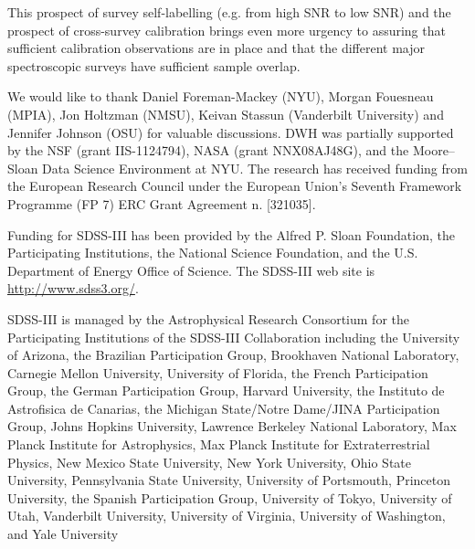 \documentclass[12pt, preprint]{aastex}
\begin{document}
This prospect of survey self-labelling (e.g. from high SNR to low SNR) and the prospect of cross-survey calibration brings even more urgency to assuring that sufficient calibration observations are in place and that the different major spectroscopic surveys have sufficient sample overlap.

\acknowledgements

We would like to thank Daniel Foreman-Mackey (NYU), 
Morgan Fouesneau (MPIA), Jon Holtzman (NMSU),  Keivan Stassun (Vanderbilt University) and Jennifer Johnson (OSU)
for valuable discussions.
DWH was partially supported by
the NSF (grant IIS-1124794), NASA (grant NNX08AJ48G), and the
Moore--Sloan Data Science Environment at NYU.
The research has received funding from the European Research Council under the European
Union's Seventh Framework Programme (FP 7) ERC Grant Agreement n.
[321035].

Funding for SDSS-III has been provided by the Alfred P. Sloan Foundation, the Participating Institutions, 
the National Science Foundation, and the U.S. Department of Energy Office of Science. The SDSS-III web site is \url{http://www.sdss3.org/}.

SDSS-III is managed by the Astrophysical Research Consortium for the Participating Institutions of the SDSS-III Collaboration
 including the University of Arizona, the Brazilian Participation Group, Brookhaven National Laboratory, Carnegie Mellon University, 
 University of Florida, the French Participation Group, the German Participation Group, Harvard University, the Instituto de Astrofisica 
 de Canarias, the Michigan State/Notre Dame/JINA Participation Group, Johns Hopkins University, Lawrence Berkeley National Laboratory, 
 Max Planck Institute for Astrophysics, Max Planck Institute for Extraterrestrial Physics, New Mexico State University, New York University, 
 Ohio State University, Pennsylvania State University, University of Portsmouth, Princeton University, the Spanish Participation Group, 
 University of Tokyo, University of Utah, Vanderbilt University, University of Virginia, University of Washington, and Yale University



\end{document}
